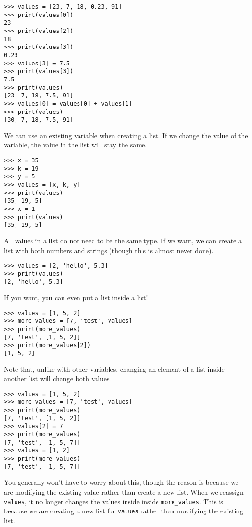 \documentclass[11pt]{cselabheader}
\begin{document}
\begin{lstlisting}[style=ipython]
>>> values = [23, 7, 18, 0.23, 91]
>>> print(values[0])
23
>>> print(values[2])
18
>>> print(values[3])
0.23
>>> values[3] = 7.5
>>> print(values[3])
7.5
>>> print(values)
[23, 7, 18, 7.5, 91]
>>> values[0] = values[0] + values[1]
>>> print(values)
[30, 7, 18, 7.5, 91]
\end{lstlisting}

We can use an existing variable when creating a list. If we change the value of the variable, the value in the list will stay the same.

\begin{lstlisting}[style=ipython]
>>> x = 35
>>> k = 19
>>> y = 5
>>> values = [x, k, y]
>>> print(values)
[35, 19, 5]
>>> x = 1
>>> print(values)
[35, 19, 5]
\end{lstlisting}

All values in a list do not need to be the same type. If we want, we can create a list with both numbers and strings (though this is almost never done).

\begin{lstlisting}[style=ipython]
>>> values = [2, 'hello', 5.3]
>>> print(values)
[2, 'hello', 5.3]
\end{lstlisting}

If you want, you can even put a list inside a list!

\begin{lstlisting}[style=ipython]
>>> values = [1, 5, 2]
>>> more_values = [7, 'test', values]
>>> print(more_values)
[7, 'test', [1, 5, 2]]
>>> print(more_values[2])
[1, 5, 2]
\end{lstlisting}

Note that, unlike with other variables, changing an element of a list inside another list will change both values.

\begin{lstlisting}[style=ipython]
>>> values = [1, 5, 2]
>>> more_values = [7, 'test', values]
>>> print(more_values)
[7, 'test', [1, 5, 2]]
>>> values[2] = 7
>>> print(more_values)
[7, 'test', [1, 5, 7]]
>>> values = [1, 2]
>>> print(more_values)
[7, 'test', [1, 5, 7]]
\end{lstlisting}

You generally won't have to worry about this, though the reason is because we are modifying the existing value rather than create a new list. When we reassign \lstinline{values}, it no longer changes the values inside inside \lstinline{more_values}. This is because we are creating a new list for \lstinline{values} rather than modifying the existing list.
\end{document}
